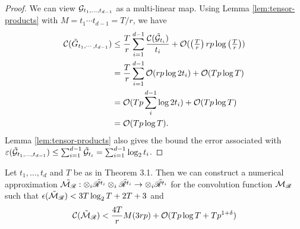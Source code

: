 \begin{proof}
    We can view $\mathcal G_{t_1, \ldots, t_{d-1}}$ as a multi-linear map. Using Lemma \ref{lem:tensor-products} with $M = t_1\cdots t_{d-1} = T/r$, we have
    \begin{align*}
        \mathcal C(\tilde{G}_{t_1, \cdots, t_{d-1}}) &\leq \frac{T}{r} \sum^{d-1}_{i=1} \frac{\mathcal C(\tilde{\mathcal G}_{t_i})}{t_i} + \mathcal O(\left(\tfrac{T}{r}\right)rp\log \left(\tfrac{T}{r}\right))\\
                                                &= \frac{T}{r}\sum^{d-1}_{i=1}\mathcal O(rp\log 2t_i) + \mathcal O(Tp \log T)\\
                                                &= \mathcal O(Tp \sum_i^{d-1}\log 2t_i) + \mathcal O(Tp \log T)\\
                                                &= \mathcal O(Tp \log T).
    \end{align*}
    Lemma \ref{lem:tensor-products} also gives the bound the error associated with $\varepsilon(\tilde{\mathcal G}_{t_1, \ldots, t_{d-1}}) \le \sum_{i=1}^{d-1}\tilde{\mathcal G}_{t_i} = \sum_{i=1}^{d-1} \log_2 t_i$.
\end{proof}

\begin{proposition}
    Let $t_1, \ldots, t_d$ and $T$ be as in Theorem 3.1. Then we can construct a numerical approximation $\tilde{\mathcal M_{\mathscr{R}}}: \otimes_i \tilde{\mathscr{R}^{t_i}} \otimes_i \tilde{\mathscr{R}^{t_i}} \to \otimes_i \tilde{\mathscr{R}^{t_i}}$ for the convolution function $\mathcal M_{\mathscr{R}}$ such that $\epsilon(\tilde{\mathcal M}_{\mathscr{R}}) < 3T \log_2 T + 2T + 3$ and
    \[
        \mathcal C(\tilde{\mathcal M}_{\mathscr{R}}) < \frac{4T}{r}M(3rp) + \mathcal O(Tp \log T + T p^{1 + \delta})
    \]
\end{proposition}

